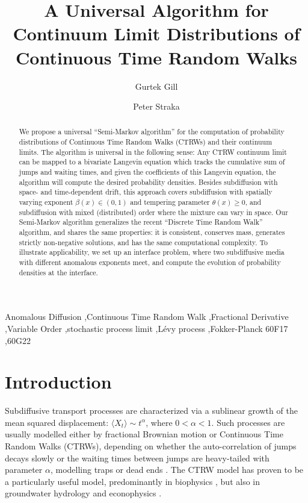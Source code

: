 \documentclass[a4paper,12pt]{elsarticle}
\numberwithin{equation}{section}
\theoremstyle{plain}
\theoremstyle{definition}
\theoremstyle{remark}
\numberwithin{equation}{section}
\newcommand{\1}{\mathbf 1}
\begin{document}
\begin{frontmatter}

\title{A Universal Algorithm for Continuum Limit Distributions of
Continuous Time Random Walks}
\author[UNSW]{Gurtek Gill}
\author[UNSW]{Peter Straka}
\address[UNSW]{School of Mathematics \& Statistics, UNSW Sydney}

\begin{abstract}
We propose a universal ``Semi-Markov algorithm'' for the computation of
probability distributions of Continuous Time Random Walks (CTRWs) and their
continuum limits.
The algorithm is universal in the following sense: Any CTRW continuum limit
can be mapped to a bivariate Langevin equation which tracks the cumulative sum
of jumps and waiting times, and given the coefficients of this Langevin
equation, the algorithm will compute the desired probability densities.
Besides subdiffusion with space- and time-dependent drift, this approach
covers subdiffusion with spatially varying exponent $\beta(x) \in (0,1)$ and
tempering parameter $\theta(x) \ge 0$, and subdiffusion with mixed (distributed)
order where the mixture can vary in space.
Our Semi-Markov algorithm generalizes the recent
``Discrete Time Random Walk'' algorithm, and shares the same properties:
it is consistent, conserves mass, generates strictly non-negative solutions,
and has the same computational complexity.
To illustrate applicability, we set up an interface problem, where two
subdiffusive media with different anomalous exponents meet, and compute the
evolution of probability densities at the interface. 
\end{abstract}

\begin{keyword}
Anomalous Diffusion \sep Continuous Time Random Walk \sep Fractional Derivative \sep Variable Order \sep stochastic process limit \sep L\'evy process \sep Fokker-Planck
\MSC[2010] 60F17 \sep  60G22
\end{keyword}

\end{frontmatter}

\section{Introduction}

Subdiffusive transport processes are characterized via a sublinear growth of the
mean squared displacement: $\langle X_t \rangle \sim t^\alpha$, where
$0 < \alpha < 1$. Such processes are usually modelled either by fractional 
Brownian motion or Continuous Time Random Walks (CTRWs), depending on 
whether the auto-correlation of jumps decays slowly or the waiting times 
between jumps are heavy-tailed with parameter $\alpha$, modelling traps 
or dead ends \citep{HLS2010b}. 
The CTRW model has proven to be a particularly useful model, predominantly in 
biophysics
\citep{Metzler2000,TMT04,Wong04,Banks2005,Santamaria2006a,
Hofling2012,Regner2013}, 
but also in groundwater hydrology \citep{Berkowitz2008,SchumerMIM} and 
econophysics \citep{Scalas2006}.
\end{document}
